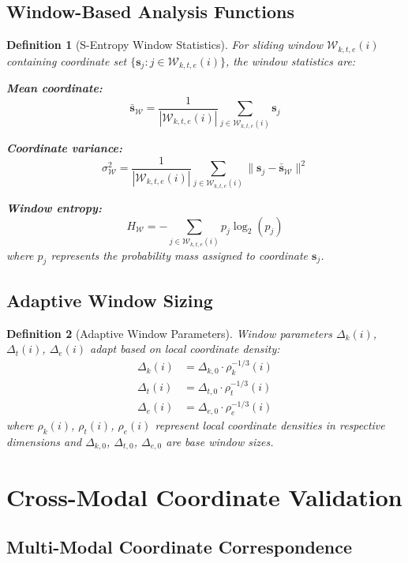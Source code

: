 \documentclass[12pt,a4paper]{article}
\newtheorem{definition}{Definition}
\begin{document}
\subsection{Window-Based Analysis Functions}

\begin{definition}[S-Entropy Window Statistics]
For sliding window $\mathcal{W}_{k,t,e}(i)$ containing coordinate set $\{\mathbf{s}_j : j \in \mathcal{W}_{k,t,e}(i)\}$, the window statistics are:

\textbf{Mean coordinate:}
$$\bar{\mathbf{s}}_{\mathcal{W}} = \frac{1}{|\mathcal{W}_{k,t,e}(i)|} \sum_{j \in \mathcal{W}_{k,t,e}(i)} \mathbf{s}_j$$

\textbf{Coordinate variance:}
$$\sigma^2_{\mathcal{W}} = \frac{1}{|\mathcal{W}_{k,t,e}(i)|} \sum_{j \in \mathcal{W}_{k,t,e}(i)} \|\mathbf{s}_j - \bar{\mathbf{s}}_{\mathcal{W}}\|^2$$

\textbf{Window entropy:}
$$H_{\mathcal{W}} = -\sum_{j \in \mathcal{W}_{k,t,e}(i)} p_j \log_2(p_j)$$
where $p_j$ represents the probability mass assigned to coordinate $\mathbf{s}_j$.
\end{definition}

\subsection{Adaptive Window Sizing}

\begin{definition}[Adaptive Window Parameters]
Window parameters $\Delta_k(i)$, $\Delta_t(i)$, $\Delta_e(i)$ adapt based on local coordinate density:
\begin{align}
\Delta_k(i) &= \Delta_{k,0} \cdot \rho_k^{-1/3}(i) \\
\Delta_t(i) &= \Delta_{t,0} \cdot \rho_t^{-1/3}(i) \\
\Delta_e(i) &= \Delta_{e,0} \cdot \rho_e^{-1/3}(i)
\end{align}
where $\rho_k(i)$, $\rho_t(i)$, $\rho_e(i)$ represent local coordinate densities in respective dimensions and $\Delta_{k,0}$, $\Delta_{t,0}$, $\Delta_{e,0}$ are base window sizes.
\end{definition}

\section{Cross-Modal Coordinate Validation}

\subsection{Multi-Modal Coordinate Correspondence}
\end{document}
